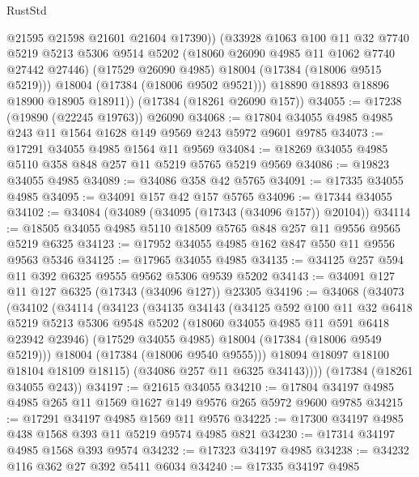\begin{lexlean}{RustStd}
\begin{coremodule}
              @21595
              @21598
              @21601
              @21604
              @17390))
          (@33928
            @1063
            @100
            @11
            @32
            @7740
            @5219
            @5213
            @5306
            @9514
            @5202
            (@18060 @26090 @4985 @11 @1062 @7740 @27442 @27446)
            (@17529 @26090 @4985)
            @18004
            (@17384 (@18006 @9515 @5219)))
          @18004
          (@17384 (@18006 @9502 @9521)))
        @18890
        @18893
        @18896
        @18900
        @18905
        @18911))
    (@17384 (@18261 @26090 @157))
@34055 := @17238 (@19890 (@22245 @19763)) @26090
@34068 := @17804 @34055 @4985 @4985 @243 @11 @1564 @1628 @149 @9569 @243 @5972 @9601 @9785
@34073 := @17291 @34055 @4985 @1564 @11 @9569
@34084 := @18269 @34055 @4985 @5110 @358 @848 @257 @11 @5219 @5765 @5219 @9569
@34086 := @19823 @34055 @4985
@34089 := @34086 @358 @42 @5765
@34091 := @17335 @34055 @4985
@34095 := @34091 @157 @42 @157 @5765
@34096 := @17344 @34055
@34102 := @34084 (@34089 (@34095 (@17343 (@34096 @157)) @20104))
@34114 := @18505 @34055 @4985 @5110 @18509 @5765 @848 @257 @11 @9556 @9565 @5219 @6325
@34123 := @17952 @34055 @4985 @162 @847 @550 @11 @9556 @9563 @5346
@34125 := @17965 @34055 @4985
@34135 := @34125 @257 @594 @11 @392 @6325 @9555 @9562 @5306 @9539 @5202
@34143 := @34091 @127 @11 @127 @6325 (@17343 (@34096 @127)) @23305
@34196 := @34068
    (@34073
      (@34102
        (@34114
          (@34123
            (@34135
              @34143
              (@34125
                @592
                @100
                @11
                @32
                @6418
                @5219
                @5213
                @5306
                @9548
                @5202
                (@18060 @34055 @4985 @11 @591 @6418 @23942 @23946)
                (@17529 @34055 @4985)
                @18004
                (@17384 (@18006 @9549 @5219)))
              @18004
              (@17384 (@18006 @9540 @9555)))
            @18094
            @18097
            @18100
            @18104
            @18109
            @18115)
          (@34086 @257 @11 @6325 @34143))))
    (@17384 (@18261 @34055 @243))
@34197 := @21615 @34055
@34210 := @17804 @34197 @4985 @4985 @265 @11 @1569 @1627 @149 @9576 @265 @5972 @9600 @9785
@34215 := @17291 @34197 @4985 @1569 @11 @9576
@34225 := @17300 @34197 @4985 @438 @1568 @393 @11 @5219 @9574 @4985 @821
@34230 := @17314 @34197 @4985 @1568 @393 @9574
@34232 := @17323 @34197 @4985
@34238 := @34232 @116 @362 @27 @392 @5411 @6034
@34240 := @17335 @34197 @4985

\end{coremodule}
\end{lexlean}

